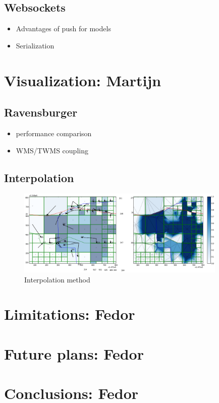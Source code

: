 \documentclass[a4paper]{article}
\begin{document}
\subsection{Websockets}
\begin{itemize}
  \item Advantages of push for models
  \item Serialization
\end{itemize}
\section{Visualization: Martijn}
\subsection{Ravensburger}
\begin{itemize}
  \item performance comparison
  \item WMS/TWMS coupling
\end{itemize}
\subsection{Interpolation}
\begin{figure}[h]
  \centering
  \includegraphics[width=10cm]{interpolationlevees2}
  \caption{Interpolation method}
  \label{fig1}
\end{figure}
\section{Limitations: Fedor}

\section{Future plans: Fedor}

\section{Conclusions: Fedor}






\end{document}

